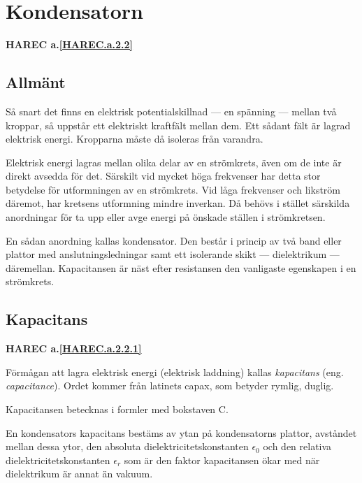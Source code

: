 \section{Kondensatorn}
\textbf{HAREC a.\ref{HAREC.a.2.2}\label{myHAREC.a.2.2}}

\subsection{Allmänt}

Så snart det finns en elektrisk potentialskillnad --- en spänning --- mellan två
kroppar, så uppstår ett elektriskt kraftfält mellan dem. Ett sådant fält är
lagrad elektrisk energi. Kropparna måste då isoleras från varandra.

Elektrisk energi lagras mellan olika delar av en strömkrets, även om de inte är
direkt avsedda för det. Särskilt vid mycket höga frekvenser har detta stor
betydelse för utformningen av en strömkrets. Vid låga frekvenser och likström
däremot, har kretsens utformning mindre inverkan. Då behövs i stället särskilda
anordningar för ta upp eller avge energi på önskade ställen i strömkretsen.

En sådan anordning kallas kondensator. Den består i princip av två band eller
plattor med anslutningsledningar samt ett isolerande skikt --- dielektrikum ---
däremellan. Kapacitansen är näst efter resistansen den vanligaste egenskapen i
en strömkrets.

\subsection{Kapacitans}
\textbf{HAREC a.\ref{HAREC.a.2.2.1}\label{myHAREC.a.2.2.1}}

Förmågan att lagra elektrisk energi (elektrisk laddning) kallas
\emph{kapacitans} (eng. \emph{capacitance}).
Ordet kommer från latinets capax, som betyder rymlig, duglig.

Kapacitansen betecknas i formler med bokstaven C.

En kondensators kapacitans bestäms av ytan på kondensatorns plattor, avståndet
mellan dessa ytor, den absoluta dielektricitetskonstanten \(\epsilon_0\) och den
relativa dielektricitetskonstanten \(\epsilon_r\) som är den faktor kapacitansen
ökar med när dielektrikum är annat än vakuum.

